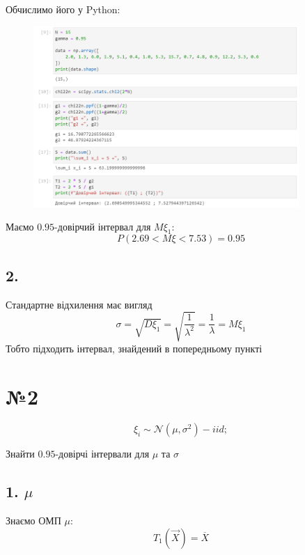 \documentclass[11pt, a4paper]{article} %
\begin{document}
Обчислимо його у Python:
\begin{figure}[h]
    \centering
    \includegraphics[width=0.9\textwidth]{img/task1.png}
\end{figure}

\begin{mdframed}[style=ans]
    Маємо $0.95$-довірчий інтервал для $M\xi_1$:
    $$P\left(2.69 < M\xi < 7.53\right) = 0.95$$
\end{mdframed}

\subsection*{2.}
Стандартне відхилення має вигляд
$$\sigma = \sqrt{D\xi_1} = \sqrt{\frac{1}{\lambda^2}} = \frac{1}{\lambda} = M\xi_1$$
Тобто підходить інтервал, знайдений в попередньому пункті
\pagebreak

\section*{№2}
\begin{mdframed}
    $$\xi_i \sim \mathcal{N}(\mu, \sigma^2) - iid;$$

    Знайти $0.95$-довірчі інтервали для $\mu$ та $\sigma$
\end{mdframed}

\subsection*{1. $\mu$}
Знаємо ОМП $\mu$:
$$T_1(\vec X) = \overline X$$

\end{document}
